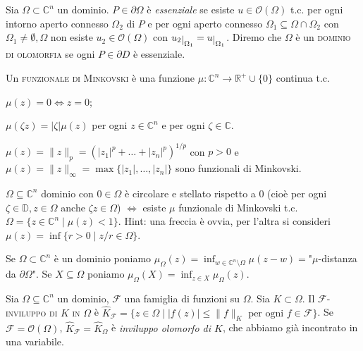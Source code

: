 \begin{defn}
  Sia $\Omega \subset \mathbb{C}^n$ un dominio. $P \in \partial \Omega$ è \textit{essenziale} se esiste $u \in \mathcal{O}(\Omega)$ t.c. per ogni intorno aperto connesso $\Omega_2$ di $P$ e per ogni aperto connesso $\Omega_1 \subseteq \Omega \cap \Omega_2$ con $\Omega_1\not=\emptyset,\Omega$ non esiste $u_2 \in \mathcal{O}(\Omega)$ con $u_2\restrict{\Omega_1}=u\restrict{\Omega_1}$.
  Diremo che $\Omega$ è un \textsc{dominio di olomorfia} se ogni $P \in \partial D$ è essenziale.
\end{defn}

\begin{defn}
  Un \textsc{funzionale di Minkovski} è una funzione $\mu:\mathbb{C}^n \longrightarrow \mathbb{R}^+\cup\{0\}$ continua t.c.
  \begin{nlist}
    \item $\mu(z)=0 \iff z=0$;
    \item $\mu(\zeta z)=|\zeta|\mu(z)$ per ogni $z \in \mathbb{C}^n$ e per ogni $\zeta \in \mathbb{C}$.
  \end{nlist}
\end{defn}

\begin{ex}
  $\mu(z)=\|z\|_p=(|z_1|^p+\dots+|z_n|^p)^{1/p}$ con $p>0$ e $\mu(z)=\|z\|_{\infty}=\max\{|z_1|,\dots,|z_n|\}$ sono funzionali di Minkovski.
\end{ex}

\begin{exc}
  $\Omega \subseteq \mathbb{C}^n$ dominio con $0 \in \Omega$ è circolare e stellato rispetto a $0$ (cioè per ogni $\zeta \in \mathbb{D}, z \in \Omega$ anche $\zeta z \in \Omega$) $\iff$ esiste $\mu$ funzionale di Minkovski t.c. $\Omega=\{z \in \mathbb{C}^n \mid \mu(z)<1\}$. Hint: una freccia è ovvia, per l'altra si consideri $\mu(z)=\inf\{r>0 \mid z/r \in \Omega \}$.
\end{exc}

Se $\Omega \subset \mathbb{C}^n$ è un dominio poniamo $\displaystyle \mu_\Omega(z)=\inf_{w \in \mathbb{C}^n\setminus\Omega} \mu(z-w)=$"$\mu$-distanza da $\partial\Omega$". Se $X \subseteq \Omega$ poniamo $\displaystyle \mu_\Omega(X)=\inf_{z \in X} \mu_\Omega(z)$.

\begin{defn}
  Sia $\Omega \subseteq \mathbb{C}^n$ un dominio, $\mathcal{F}$ una famiglia di funzioni su $\Omega$. Sia $K \subset \Omega$. Il \textsc{$\mathcal{F}$-inviluppo di $K$ in $\Omega$} è $\hat{K}_{\mathcal{F}}=\{z \in \Omega \mid |f(z)| \le \|f\|_K \text{ per ogni } f \in \mathcal{F}\}$.
  Se $\mathcal{F}=\mathcal{O}(\Omega)$, $\hat{K}_{\mathcal{F}}=\hat{K}_{\Omega}$ è \textit{inviluppo olomorfo di $K$}, che abbiamo già incontrato in una variabile.
\end{defn}

